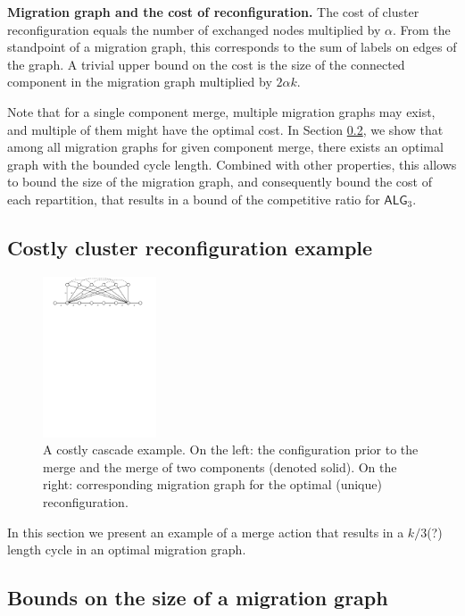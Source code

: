 \documentclass[manuscript,screen=true, review, anonymous]{acmart}
\newcommand{\TAlg}{{\ensuremath{\textsf{ALG}_{3}}}\xspace}
\begin{document}
\noindent
\textbf{Migration graph and the cost of reconfiguration.}
The cost of cluster reconfiguration equals the number of exchanged nodes multiplied by $\alpha$.
From the standpoint of a migration graph, this corresponds to the sum of labels on edges of the graph.
A trivial upper bound on the cost is the size of the connected component in the migration graph multiplied by $2\alpha k$.

\medskip

Note that for a single component merge, multiple migration graphs may exist, and multiple of them might have the optimal cost.
In Section \ref{ssec:cascade}, we show that among all migration graphs for given component merge, there exists an optimal graph with the bounded cycle length.
Combined with other properties, this allows to bound the size of the migration graph, and consequently bound the cost of each repartition, that results in a bound of the competitive ratio for \TAlg.

\subsection{Costly cluster reconfiguration example}
\label{ssec:example}



\begin{figure}[H]
  \centering
    \includegraphics[width=0.3\textwidth]{figs/substitute}
    \caption{A costly cascade example. On the left: the configuration prior to the merge and the merge of two components (denoted solid). On the right: corresponding migration graph for the optimal (unique) reconfiguration.}
  \end{figure}


In this section we present an example of a merge action that results in a $k/3$(?) length cycle in an optimal migration graph.

\subsection{Bounds on the size of a migration graph}
\label{ssec:cascade}
\end{document}
